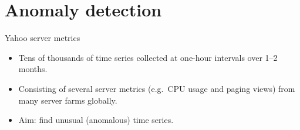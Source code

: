 \documentclass[14pt,ignorenonframetext,]{beamer}
\providecommand{\tightlist}{%
  \setlength{\itemsep}{0pt}\setlength{\parskip}{0pt}}
\begin{document}
\hypertarget{anomaly-detection}{%
\section{Anomaly detection}\label{anomaly-detection}}

\begin{frame}{Yahoo server metrics}
\protect\hypertarget{yahoo-server-metrics}{}

\fontsize{13}{15}\sf\vspace*{-0.2cm}

\begin{itemize}
\tightlist
\item
  Tens of thousands of time series collected at one-hour intervals over
  1--2 months.
\item
  Consisting of several server metrics (e.g.~CPU usage and paging views)
  from many server farms globally.
\item
  Aim: find unusual (anomalous) time series.
\end{itemize}

\vspace*{10cm}

\end{frame}
\end{document}
